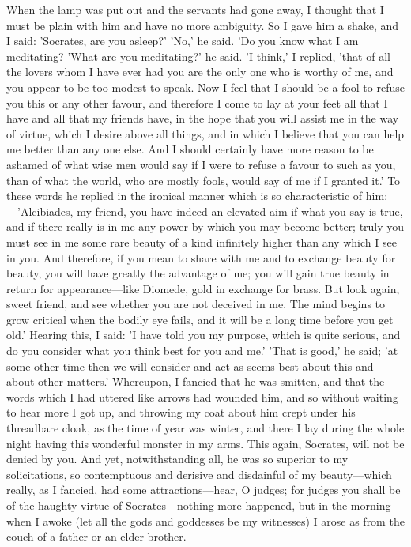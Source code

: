 \para[149] When the lamp was put out and the servants had gone away, I thought that I must be plain with him and have no more ambiguity. So I gave him a shake, and I said: 'Socrates, are you asleep?' 'No,' he said. 'Do you know what I am meditating? 'What are you meditating?' he said. 'I think,' I replied, 'that of all the lovers whom I have ever had you are the only one who is worthy of me, and you appear to be too modest to speak. Now I feel that I should be a fool to refuse you this or any other favour, and therefore I come to lay at your feet all that I have and all that my friends have, in the hope that you will assist me in the way of virtue, which I desire above all things, and in which I believe that you can help me better than any one else. And I should certainly have more reason to be ashamed of what wise men would say if I were to refuse a favour to such as you, than of what the world, who are mostly fools, would say of me if I granted it.' To these words he replied in the ironical manner which is so characteristic of him:---'Alcibiades, my friend, you have indeed an elevated aim if what you say is true, and if there really is in me any power by which you may become better; truly you must see in me some rare beauty of a kind infinitely higher than any which I see in you. And therefore, if you mean to share with me and to exchange beauty for beauty, you will have greatly the advantage of me; you will gain true beauty in return for appearance---like Diomede, gold in exchange for brass. But look again, sweet friend, and see whether you are not deceived in me. The mind begins to grow critical when the bodily eye fails, and it will be a long time before you get old.' Hearing this, I said: 'I have told you my purpose, which is quite serious, and do you consider what you think best for you and me.' 'That is good,' he said; 'at some other time then we will consider and act as seems best about this and about other matters.' Whereupon, I fancied that he was smitten, and that the words which I had uttered like arrows had wounded him, and so without waiting to hear more I got up, and throwing my coat about him crept under his threadbare cloak, as the time of year was winter, and there I lay during the whole night having this wonderful monster in my arms. This again, Socrates, will not be denied by you. And yet, notwithstanding all, he was so superior to my solicitations, so contemptuous and derisive and disdainful of my beauty---which really, as I fancied, had some attractions---hear, O judges; for judges you shall be of the haughty virtue of Socrates---nothing more happened, but in the morning when I awoke (let all the gods and goddesses be my witnesses) I arose as from the couch of a father or an elder brother.


